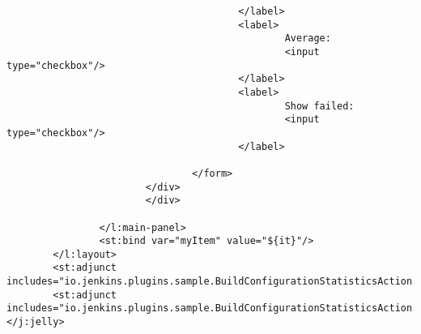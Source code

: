 \begin{lstlisting}
                                        </label>
                                        <label>
                                                Average:
                                                <input type="checkbox"/>
                                        </label>
                                        <label>
                                                Show failed:
                                                <input type="checkbox"/>
                                        </label>

                                </form>
                        </div>
                        </div>

                </l:main-panel>
                <st:bind var="myItem" value="${it}"/>
        </l:layout>
        <st:adjunct includes="io.jenkins.plugins.sample.BuildConfigurationStatisticsAction.declareChartJsClickArray"/>
        <st:adjunct includes="io.jenkins.plugins.sample.BuildConfigurationStatisticsAction.chartLogicBox"/>
</j:jelly>

\end{lstlisting}

